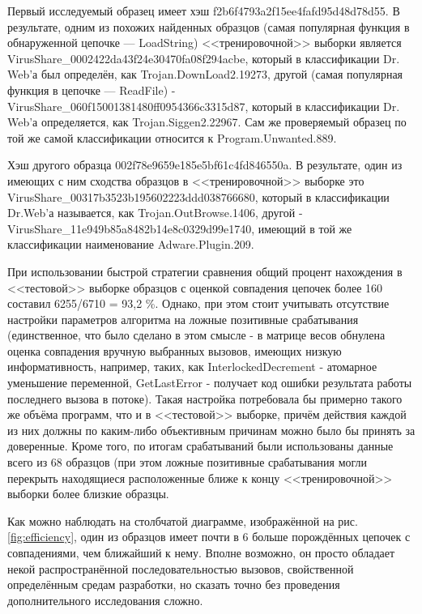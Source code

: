 Первый исследуемый образец имеет хэш f2b6f4793a2f15ee4fafd95d48d78d55. В результате, одним из похожих найденных образцов (самая популярная функция в обнаруженной цепочке --- LoadString) <<тренировочной>> выборки является VirusShare\_0002422da43f24e30470fa08f294acbe, который в классификации Dr. Web'а был определён, как Trojan.DownLoad2.19273, другой (самая популярная функция в цепочке --- ReadFile) - VirusShare\_060f15001381480ff0954366c3315d87, который в  классификации Dr. Web'а определяется, как Trojan.Siggen2.22967. Сам же проверяемый образец по той же самой классификации относится к Program.Unwanted.889.

Хэш другого образца 002f78e9659e185e5bf61c4fd846550a. В результате, один из имеющих с ним сходства образцов в <<тренировочной>> выборке это VirusShare\_00317b3523b195602223ddd038766680, который в классификации Dr.Web'а называется, как Trojan.OutBrowse.1406, другой - VirusShare\_11e949b85a8482b14e8c0329d99e1740, имеющий в той же классификации наименование Adware.Plugin.209.

При использовании быстрой стратегии сравнения общий процент нахождения в <<тестовой>> выборке образцов с оценкой совпадения цепочек более 160 составил 6255/6710 = 93,2 \%. Однако, при этом стоит учитывать отсутствие настройки параметров алгоритма на ложные позитивные срабатывания (единственное, что было сделано в этом смысле - в матрице весов обнулена оценка совпадения вручную выбранных вызовов, имеющих низкую информативность,  например, таких, как InterlockedDecrement - атомарное уменьшение переменной, GetLastError - получает код ошибки результата работы последнего вызова в потоке). Такая настройка потребовала бы примерно такого же объёма программ, что и в <<тестовой>> выборке, причём действия каждой из них должны по каким-либо объективным причинам можно было бы принять за доверенные. Кроме того, по итогам срабатываний были использованы данные всего из 68 образцов (при этом ложные позитивные срабатывания могли перекрыть находящиеся расположенные ближе к концу <<тренировочной>> выборки более близкие образцы.

Как можно наблюдать на столбчатой диаграмме, изображённой на рис. \ref {fig:efficiency}, один из образцов имеет почти в 6 больше порождённых цепочек с совпадениями, чем ближайший к нему. Вполне возможно, он просто обладает некой распространённой последовательностью вызовов, свойственной определённым средам разработки, но сказать точно без проведения дополнительного исследования сложно.
    
